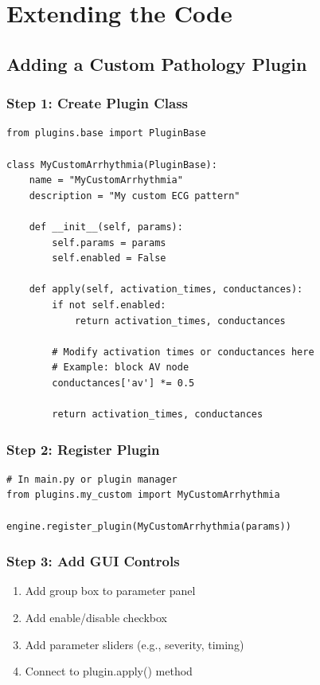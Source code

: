 \documentclass[11pt, a4paper]{article}
\begin{document}
\section{Extending the Code}

\subsection{Adding a Custom Pathology Plugin}

\subsubsection{Step 1: Create Plugin Class}
\begin{lstlisting}
from plugins.base import PluginBase

class MyCustomArrhythmia(PluginBase):
    name = "MyCustomArrhythmia"
    description = "My custom ECG pattern"
    
    def __init__(self, params):
        self.params = params
        self.enabled = False
    
    def apply(self, activation_times, conductances):
        if not self.enabled:
            return activation_times, conductances
        
        # Modify activation times or conductances here
        # Example: block AV node
        conductances['av'] *= 0.5
        
        return activation_times, conductances
\end{lstlisting}

\subsubsection{Step 2: Register Plugin}
\begin{lstlisting}
# In main.py or plugin manager
from plugins.my_custom import MyCustomArrhythmia

engine.register_plugin(MyCustomArrhythmia(params))
\end{lstlisting}

\subsubsection{Step 3: Add GUI Controls}
\begin{enumerate}
    \item Add group box to parameter panel
    \item Add enable/disable checkbox
    \item Add parameter sliders (e.g., severity, timing)
    \item Connect to plugin.apply() method
\end{enumerate}
\end{document}
